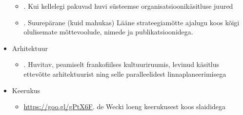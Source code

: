 \documentclass[nobib]{tufte-handout}
\begin{document}
\begin{itemize}
\begin{itemize}
		\item \cite{optner}. Kui kellelegi pakuvad huvi süsteemse organisatsioonikäsitluse juured
		\item \cite{freedman2013strategy}. Suurepärane (kuid mahukas) Lääne strateegiamõtte ajalugu koos kõigi olulisemate mõttevoolude, nimede ja publikatsioonidega. 
	\end{itemize}
	\item Arhitektuur
	\begin{itemize}
		\item \cite{longepe2003enterprise}. Huvitav, peamiselt frankofiilses kultuuriruumis, levinud käsitlus ettevõtte arhitektuurist ning selle paralleelidest linnaplaneerimisega
	\end{itemize}
	\item Keerukus
	\begin{itemize}
		\item \url{https://goo.gl/gPtX6F}. de Wecki loeng keerukusest koos slaididega
	\end{itemize}
\end{itemize}










\end{document}
